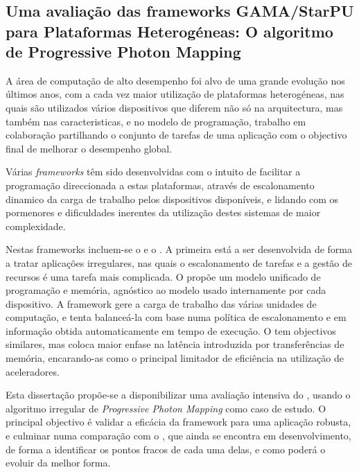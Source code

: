 \documentclass[main.tex]{subfiles}
\begin{document}
\cleardoublepage
{}
{}
\chapter*{\abstractname}
  \section*{Uma avaliação das frameworks GAMA/StarPU para Plataformas Heterogéneas: O algoritmo de Progressive Photon Mapping}

  A área de computação de alto desempenho foi alvo de uma grande evolução nos últimos anos, com a cada vez maior utilização de plataformas heterogéneas, nas quais são utilizados vários dispositivos que diferem não só na arquitectura, mas também nas caracteristicas, e no modelo de programação, trabalho em colaboração partilhando o conjunto de tarefas de uma aplicação com o objectivo final de melhorar o desempenho global.

  Várias \textit{frameworks} têm sido desenvolvidas com o intuito de facilitar a programação direccionada a estas plataformas, através de escalonamento dinamico da carga de trabalho pelos dispositivos disponíveis, e lidando com os pormenores e dificuldades inerentes da utilização destes sistemas de maior complexidade.

  Nestas frameworks incluem-se o \gama e o \starpu. A primeira está a ser desenvolvida de forma a tratar aplicações irregulares, nas quais o escalonamento de tarefas e a gestão de recursos é uma tarefa mais complicada. O \gama propõe um modelo unificado de programação e memória, agnóstico ao modelo usado internamente por cada dispositivo. A framework gere a carga de trabalho das várias unidades de computação, e tenta balanceá-la com base numa política de escalonamento e em informação obtida automaticamente em tempo de execução. O \starpu tem objectivos similares, mas coloca maior enfase na latência introduzida por transferências de memória, encarando-as como o principal limitador de eficiência na utilização de aceleradores.

  Esta dissertação propõe-se a disponibilizar uma avaliação intensiva do \starpu, usando o algoritmo irregular de \textit{Progressive Photon Mapping} como caso de estudo. O principal objectivo é validar a eficácia da framework para uma aplicação robusta, e culminar numa comparação com o \gama, que ainda se encontra em desenvolvimento, de forma a identificar os pontos fracos de cada uma delas, e como poderá o \gama evoluir da melhor forma.
\end{document}
